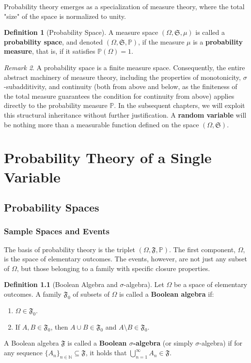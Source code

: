 \documentclass[12pt, openany]{book}
\theoremstyle{definition}
\newtheorem{definition}{Definition}[section]
\theoremstyle{plain}
\theoremstyle{remark}
\newtheorem{remark}[definition]{Remark}
\newcommand{\N}{\mathbb{N}}
\newcommand{\probP}{\mathbb{P}}
\newcommand{\germS}{\mathfrak{S}} %
\newcommand{\germF}{\mathfrak{F}} %
\begin{document}
Probability theory emerges as a specialization of measure theory, where the total "size" of the space is normalized to unity.

\begin{definition}[Probability Space]
A measure space $(\Omega, \germS, \mu)$ is called a \textbf{probability space}, and denoted $(\Omega, \germS, \probP)$, if the measure $\mu$ is a \textbf{probability measure}, that is, if it satisfies $\probP(\Omega) = 1$.
\end{definition}

\begin{remark}
A probability space is a finite measure space. Consequently, the entire abstract machinery of measure theory, including the properties of monotonicity, $\sigma$-subadditivity, and continuity (both from above and below, as the finiteness of the total measure guarantees the condition for continuity from above) applies directly to the probability measure $\probP$. In the subsequent chapters, we will exploit this structural inheritance without further justification. A \textbf{random variable} will be nothing more than a measurable function defined on the space $(\Omega, \germS)$.
\end{remark}

\chapter{Probability Theory of a Single Variable}

\section{Probability Spaces}

\subsection{Sample Spaces and Events}

The basis of probability theory is the triplet $(\Omega, \germF, \probP)$. The first component, $\Omega$, is the space of elementary outcomes. The events, however, are not just any subset of $\Omega$, but those belonging to a family with specific closure properties.

\begin{definition}[Boolean Algebra and $\sigma$-algebra]
Let $\Omega$ be a space of elementary outcomes. A family $\germF_0$ of subsets of $\Omega$ is called a \textbf{Boolean algebra} if:
\begin{enumerate}
    \item $\Omega \in \germF_0$.
    \item If $A, B \in \germF_0$, then $A \cup B \in \germF_0$ and $A \setminus B \in \germF_0$.
\end{enumerate}
A Boolean algebra $\germF$ is called a \textbf{Boolean $\sigma$-algebra} (or simply $\sigma$-algebra) if for any sequence $\{A_n\}_{n \in \N} \subseteq \germF$, it holds that $\bigcup_{n=1}^{\infty} A_n \in \germF$.
\end{definition}
\end{document}
